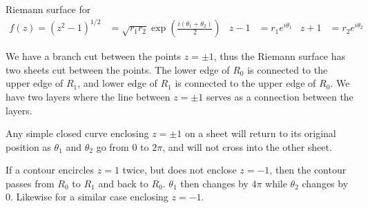 \documentclass[12pt, english]{book}
\begin{document}
	\begin{example}
		Riemann surface for
		\begin{align*}
			f(z) = (z^2 - 1)^{1/2} &= \sqrt{r_1 r_2} \exp(\frac{i(\theta_1 + \theta_2)}{2}) &
			z - 1 &= r_1 e^{i\theta_1} &
			z + 1 &= r_2 e^{i\theta_2}
		\end{align*}
		\begin{figure}[H]
			\centering
		\end{figure}
	
		We have a branch cut between the points \(z = \pm 1\), thus the Riemann surface has two sheets cut between the points. The lower edge of \(R_0\) is connected to the upper edge of \(R_1\), and lower edge of \(R_1\) is connected to the upper edge of \(R_0\). We have two layers where the line between \(z=\pm 1\) serves as a connection between the layers.
		
		Any simple closed curve enclosing \(z = \pm 1\) on a sheet will return to its original position as \(\theta_1\) and \(\theta_2\) go from \(0\) to \(2\pi\), and will not cross into the other sheet. 
		
		If a contour encircles \(z = 1\) twice, but does not enclose \(z=-1\), then the contour passes from \(R_0\) to \(R_1\) and back to \(R_0\). \(\theta_1\) then changes by \(4\pi\) while \(\theta_2\) changes by \(0\). Likewise for a similar case enclosing \(z = -1\).
		
	\end{example}
	
\end{document}

